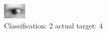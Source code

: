 \begin{figure}[h!]
\begin{center}
\includegraphics[width=0.60\columnwidth]{figures/ID725_class_2_target_4.png}
\end{center}
\caption{ Classification: 2 actual target: 4}
\label{fig:ID725_class_2_target_4}
\end{figure}
